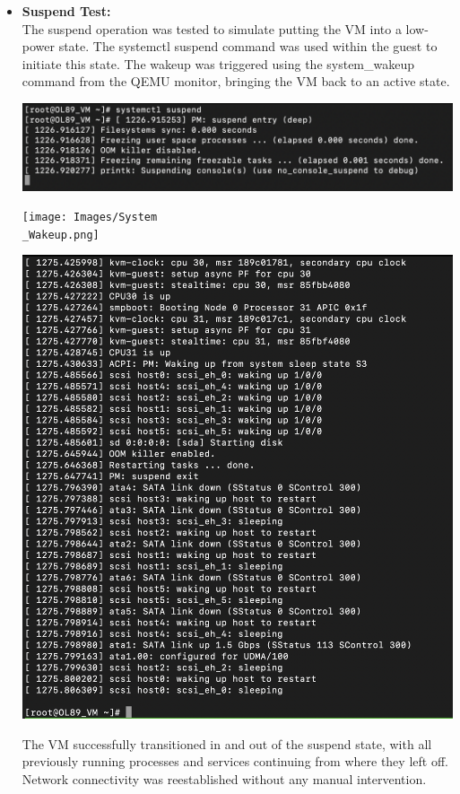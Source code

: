 \begin{itemize}
    \item \textbf{Suspend Test:}\\
          The suspend operation was tested to simulate putting the VM into a low-power state. The systemctl suspend command was used within the guest to initiate this state. The wakeup was triggered using the system\_wakeup command from the QEMU monitor, bringing the VM back to an active state.
          \begin{center}
              \includegraphics[width=\linewidth]{Images/Systemctl Suspend on the Guest.png}
              \label{fig:areboot}
          \end{center}
          \begin{center}
              \texttt{[image: Images/System\\\_Wakeup.png]}
              \label{fig:areboot}
          \end{center}
          \begin{center}
              \includegraphics[width=\linewidth]{Images/Wakeup Guest after Suspending.png}
              \label{fig:areboot}
          \end{center}
          The VM successfully transitioned in and out of the suspend state, with all previously running processes and services continuing from where they left off. Network connectivity was reestablished without any manual intervention.


\end{itemize}
